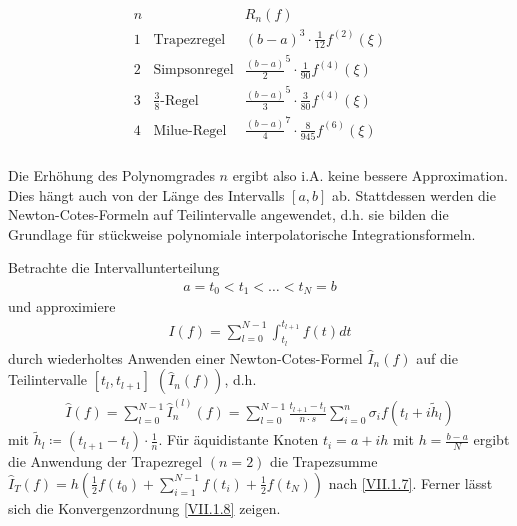 \documentclass[ngerman,fontsize=11pt, paper=a4, parskip=half, titlepage=true, toc=bib]{scrbook}
\begin{document}
\begin{gather*}\label{7.2.9}
  \begin{array}{cll}
    n & & R_n(f)\\
    1 &\text{Trapezregel} &(b-a)^3\cdot\frac{1}{12}f^{(2)}(\xi)\\
    2 &\text{Simpsonregel}&\frac{(b-a)}{2}^5\cdot\frac{1}{90}f^{(4)}(\xi)\\
    3 &\text{$\frac{3}{8}$-Regel}&\frac{(b-a)}{3}^5\cdot\frac{3}{80}f^{(4)}(\xi)\\
    4 &\text{Milue-Regel}
        &\frac{(b-a)}{4}^7\cdot\frac{8}{945}f^{(6)}(\xi)\\
  \end{array}
\end{gather*}

Die Erhöhung des Polynomgrades $n$
ergibt also
i.A. keine bessere Approximation.
Dies hängt auch von der Länge des
Intervalls $[a,b]$ ab.
Stattdessen werden die
Newton-Cotes-Formeln auf
Teilintervalle angewendet, 
d.h. sie bilden die Grundlage für
stückweise polynomiale
interpolatorische Integrationsformeln.

Betrachte die Intervallunterteilung
\begin{gather*}
  a=t_0<t_1<\ldots<t_N=b
\end{gather*}
und approximiere
\begin{gather*}
  I(f) = \sum_{l=0}^{N-1}\int_{t_l}^{t_{l+1}}f(t)dt
\end{gather*}
durch wiederholtes Anwenden einer Newton-Cotes-Formel
$\hat{I}_n(f)$ auf die Teilintervalle $[t_l, t_{l+1}]$
$(\hat{I}_n(f))$,
d.h.
\begin{gather}
  \hat{I}(f) = \sum_{l=0}^{N-1}\hat{I}_n^{(l)}(f)
  = \sum_{l=0}^{N-1}\frac{t_{l+1}-t_l}{n\cdot s}
  \sum_{i=0}^n \sigma_i f(t_l+i\widetilde{h}_l)
  \label{VII.2.11}
\end{gather}
mit $\widetilde{h}_l\coloneqq (t_{l+1}-t_l)\cdot \frac{1}{n}$.
Für äquidistante Knoten $t_i=a+ih$ mit $h=\frac{b-a}{N}$
ergibt die Anwendung der Trapezregel $(n=2)$
die Trapezsumme 
$\hat{I}_T(f) = h\left(
  \frac{1}{2}f(t_0)+\sum_{i=1}^{N-1}f(t_i) +\frac{1}{2}f(t_N)
\right)$
nach \eqref{VII.1.7}. 
Ferner lässt sich die Konvergenzordnung \eqref{VII.1.8} zeigen.
\end{document}
